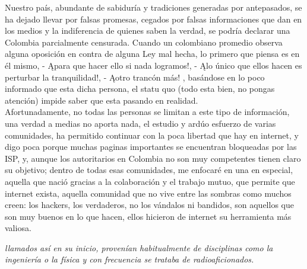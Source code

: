 \begin{multicols}{2}



\vspace{2mm}


Nuestro país, abundante de sabiduría y tradiciones generadas por antepasados, se ha dejado
llevar por falsas promesas, cegados por falsas informaciones que dan en los medios y
la indiferencia de quienes saben la verdad, se podría  declarar una Colombia parcialmente censurada.
Cuando un colombiano promedio observa alguna oposición en contra de alguna Ley mal hecha,
lo primero que piensa es en él mismo, - Ąpara que hacer ello si nada logramos!, 
- Ąlo único que ellos hacen es perturbar la tranquilidad!, - Ąotro trancón más! , 
basándose en lo poco informado que esta dicha persona, el statu quo (todo esta bien, no pongas atención) 
impide saber que esta pasando en realidad.\\

Afortunadamente, no todas las personas se limitan a este tipo de información, una verdad a medias no 
aporta nada, el estudio y ardúo esfuerzo de varias comunidades, ha permitido continuar con la poca
libertad que hay en internet, y digo poca porque muchas paginas importantes se encuentran bloqueadas por
las ISP, y, aunque los autoritarios en Colombia no son muy competentes tienen claro su objetivo; dentro de
todas esas comunidades, me enfocaré en una en especial, aquella que nació gracias a la colaboración y el
trabajo mutuo, que permite que internet exista, aquella comunidad que no vive entre las sombras como
muchos creen: los hackers, los verdaderos, no los vándalos ni bandidos, son aquellos que son muy buenos
en lo que hacen, ellos hicieron de internet su herramienta más valiosa.\\



\begin{entradilla} %
{\em {\color{introcolor}{Los Auténticos Programadores}} llamados así en su inicio, provenían
habitualmente de disciplinas como la ingeniería o la física y con frecuencia se trataba de radioaficionados.\cite{kopka1}}
\end{entradilla}


\end{multicols}
